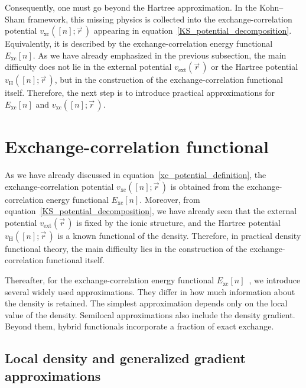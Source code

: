 Consequently, one must go beyond the Hartree approximation.
In the Kohn--Sham framework, this missing physics is collected into the exchange-correlation potential $v_\mathrm{xc}([n];\vec{r}\,)$ appearing in equation~\eqref{KS_potential_decomposition}.
Equivalently, it is described by the exchange-correlation energy functional $E_\mathrm{xc}[n]$.
As we have already emphasized in the previous subsection,
the main difficulty does not lie in the external potential $v_\mathrm{ext}(\vec{r}\,)$ or the Hartree potential $v_\mathrm{H}([n];\vec{r}\,)$,
but in the construction of the exchange-correlation functional itself.
Therefore, the next step is to introduce practical approximations for $E_\mathrm{xc}[n]$ and $v_\mathrm{xc}([n];\vec{r}\,)$.

\newpage
\section{Exchange-correlation functional}
\label{sec:exchange_correlation_functional}

As we have already discussed in equation~\eqref{xc_potential_definition},
the exchange-correlation potential $v_\mathrm{xc}([n];\vec{r}\,)$ is obtained from the exchange-correlation energy functional $E_\mathrm{xc}[n]$.
Moreover, from equation~\eqref{KS_potential_decomposition},
we have already seen that the external potential $v_\mathrm{ext}(\vec{r}\,)$ is fixed by the ionic structure,
and the Hartree potential $v_\mathrm{H}([n];\vec{r}\,)$ is a known functional of the density.
Therefore, in practical density functional theory,
the main difficulty lies in the construction of the exchange-correlation functional itself.

Thereafter, for the exchange-correlation energy functional $E_\mathrm{xc}[n]$~\cite{martin2020electronic}, we introduce several widely used approximations.
They differ in how much information about the density is retained.
The simplest approximation depends only on the local value of the density.
Semilocal approximations also include the density gradient.
Beyond them, hybrid functionals incorporate a fraction of exact exchange.

\subsection{Local density and generalized gradient approximations}

